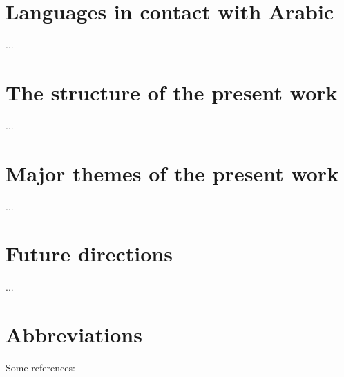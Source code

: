 \documentclass[output=paper]{langsci/langscibook}
\begin{document}
\section{Languages in contact with Arabic}
...

\section{The structure of the present work}
...

\section{Major themes of the present work}
...

\section{Future directions}
...

\section*{Abbreviations}

Some references:\\
\\
\citet{Jastrow2002}\\
\citet{Owens2000editor}\\
\citet{Owens2018}\\
\citet{Watson2011dialectsoverview}



\sloppy
\printbibliography[heading=subbibliography,notkeyword=this] 
\end{document}
